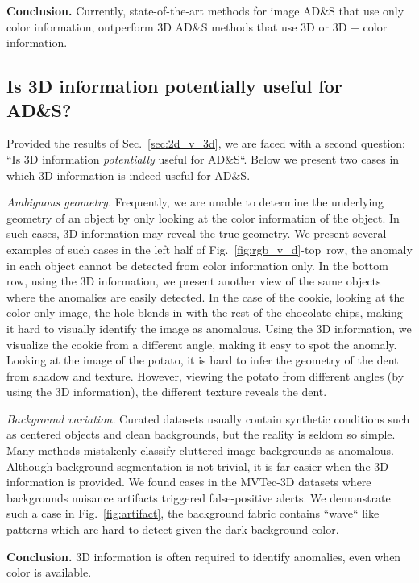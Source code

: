 \documentclass{article}
\begin{document}
\textbf{Conclusion.} Currently, state-of-the-art methods for image AD\&S that use only color information, outperform 3D AD\&S methods that use 3D or 3D + color information.\\

\subsection{Is 3D information potentially useful for AD\&S?}
\label{sec:3d_util}
Provided the results of Sec.~\ref{sec:2d_v_3d}, we are faced with a second question: ``Is 3D information \textit{potentially} useful for AD\&S``. Below we present two cases in which 3D information is indeed useful for AD\&S.




\textit{Ambiguous geometry.} Frequently, we are unable to determine the underlying geometry of an object by only looking at the color information of the object. In such cases, 3D information may reveal the true geometry. We present several examples of such cases in the left half of Fig.~\ref{fig:rgb_v_d}-top~row, the anomaly in each object cannot be detected from color information only. In the bottom row, using the 3D information, we present another view of the same objects where the anomalies are easily detected. In the case of the cookie\footnotemark[1], looking at the color-only image, the hole blends in with the rest of the chocolate chips, making it hard to visually identify the image as anomalous. 
Using the 3D information, we visualize the cookie from a different angle, making it easy to spot the anomaly. Looking at the image of the potato, it is hard to infer the geometry of the dent from shadow and texture. However, viewing the potato from different angles (by using the 3D information), the different texture reveals the dent. 

\textit{Background variation.} 
Curated datasets usually contain synthetic conditions such as centered objects and clean backgrounds, but the reality is seldom so simple. Many methods mistakenly classify cluttered image backgrounds as anomalous. Although background segmentation is not trivial, it is far easier when the 3D information is provided. We found cases in the MVTec-3D datasets where  backgrounds nuisance artifacts triggered false-positive alerts. We demonstrate such a case in Fig.~\ref{fig:artifact}, the background fabric contains ``wave`` like patterns which are hard to detect given the dark background color.

\textbf{Conclusion.} 3D information is often required to identify anomalies, even when color is available.
\end{document}
